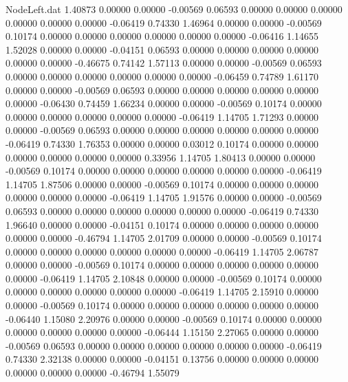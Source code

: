 \begin{filecontents}{NodeLeft.dat}
   1.40873    0.00000    0.00000    -0.00569    0.06593    0.00000    0.00000    0.00000    0.00000    0.00000    0.00000   -0.06419    0.74330
   1.46964    0.00000    0.00000    -0.00569    0.10174    0.00000    0.00000    0.00000    0.00000    0.00000    0.00000   -0.06416    1.14655
   1.52028    0.00000    0.00000    -0.04151    0.06593    0.00000    0.00000    0.00000    0.00000    0.00000    0.00000   -0.46675    0.74142
   1.57113    0.00000    0.00000    -0.00569    0.06593    0.00000    0.00000    0.00000    0.00000    0.00000    0.00000   -0.06459    0.74789
   1.61170    0.00000    0.00000    -0.00569    0.06593    0.00000    0.00000    0.00000    0.00000    0.00000    0.00000   -0.06430    0.74459
   1.66234    0.00000    0.00000    -0.00569    0.10174    0.00000    0.00000    0.00000    0.00000    0.00000    0.00000   -0.06419    1.14705
   1.71293    0.00000    0.00000    -0.00569    0.06593    0.00000    0.00000    0.00000    0.00000    0.00000    0.00000   -0.06419    0.74330
   1.76353    0.00000    0.00000     0.03012    0.10174    0.00000    0.00000    0.00000    0.00000    0.00000    0.00000    0.33956    1.14705
   1.80413    0.00000    0.00000    -0.00569    0.10174    0.00000    0.00000    0.00000    0.00000    0.00000    0.00000   -0.06419    1.14705
   1.87506    0.00000    0.00000    -0.00569    0.10174    0.00000    0.00000    0.00000    0.00000    0.00000    0.00000   -0.06419    1.14705
   1.91576    0.00000    0.00000    -0.00569    0.06593    0.00000    0.00000    0.00000    0.00000    0.00000    0.00000   -0.06419    0.74330
   1.96640    0.00000    0.00000    -0.04151    0.10174    0.00000    0.00000    0.00000    0.00000    0.00000    0.00000   -0.46794    1.14705
   2.01709    0.00000    0.00000    -0.00569    0.10174    0.00000    0.00000    0.00000    0.00000    0.00000    0.00000   -0.06419    1.14705
   2.06787    0.00000    0.00000    -0.00569    0.10174    0.00000    0.00000    0.00000    0.00000    0.00000    0.00000   -0.06419    1.14705
   2.10848    0.00000    0.00000    -0.00569    0.10174    0.00000    0.00000    0.00000    0.00000    0.00000    0.00000   -0.06419    1.14705
   2.15910    0.00000    0.00000    -0.00569    0.10174    0.00000    0.00000    0.00000    0.00000    0.00000    0.00000   -0.06440    1.15080
   2.20976    0.00000    0.00000    -0.00569    0.10174    0.00000    0.00000    0.00000    0.00000    0.00000    0.00000   -0.06444    1.15150
   2.27065    0.00000    0.00000    -0.00569    0.06593    0.00000    0.00000    0.00000    0.00000    0.00000    0.00000   -0.06419    0.74330
   2.32138    0.00000    0.00000    -0.04151    0.13756    0.00000    0.00000    0.00000    0.00000    0.00000    0.00000   -0.46794    1.55079

\end{filecontents}
